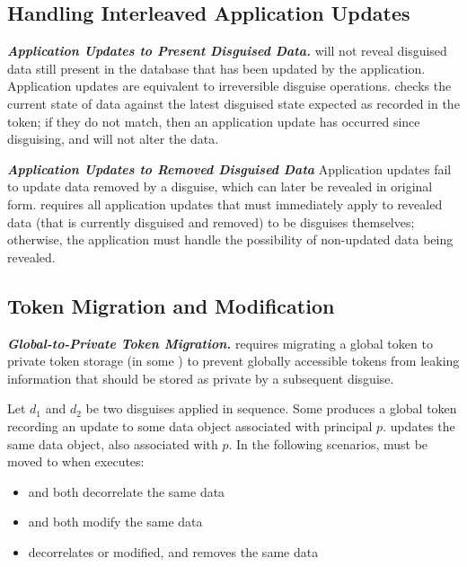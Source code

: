 \subsection{Handling Interleaved Application Updates}
\noindent\textbf{\emph{Application Updates to Present Disguised Data.}}
\sys will not reveal disguised data still present in the database that has been updated by the
application. Application updates are equivalent to irreversible disguise operations.
\sys checks the current state of data against the latest disguised state
expected as recorded in the token; if they do not match, then an application update has occurred
since disguising, and \sys will not alter the data.

\vspace{6pt}\noindent\textbf{\emph{Application Updates to Removed Disguised Data}}
Application updates fail to update data removed by a disguise, which can later be revealed in
original form.
\sys requires all application updates that must immediately apply to revealed data (that is
currently disguised and removed) to be disguises themselves; otherwise, the application must handle
the possibility of non-updated data being revealed.

\subsection{Token Migration and Modification}
\noindent\textbf{\emph{Global-to-Private Token Migration.}}
\sys requires migrating a global token to private token storage (in some ) to prevent
globally accessible tokens from leaking information that should be stored as private by a subsequent
disguise.

Let $d_1$ and $d_2$ be two disguises applied in sequence.
Some  produces a global token  recording an update to some data object
associated with principal $p$.  updates the same data object, also associated with $p$.
In the following scenarios,  must be moved to  when  executes:
\begin{itemize}
\item {} and  both decorrelate the same data
\item {} and  both modify the same data
\item {} decorrelates or modified, and  removes the same data
\end{itemize}

